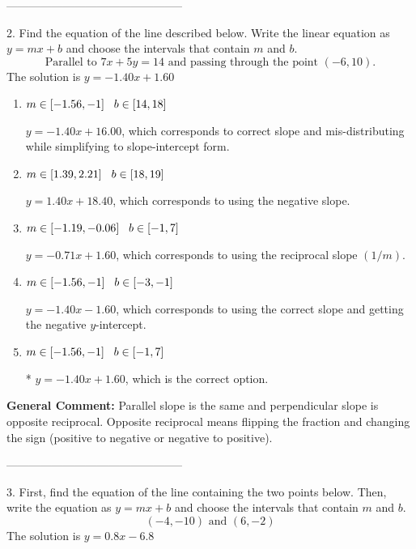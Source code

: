 \documentclass{extbook}[14pt]
\begin{document}
-----------------------------------------------

2. Find the equation of the line described below. Write the linear equation as $ y=mx+b $ and choose the intervals that contain $m$ and $b$.
\[ \text{Parallel to } 7 x + 5 y = 14 \text{ and passing through the point } (-6, 10). \] 
The solution is $ y = -1.40x + 1.60 $ 

\begin{enumerate}[label=\Alph*.] 
\item $ m \in [-1.56, -1] \hspace*{3mm} b \in [14, 18] $ 

  $y = -1.40x + 16.00$, which corresponds to correct slope and mis-distributing while simplifying to slope-intercept form. 
\item $ m \in [1.39, 2.21] \hspace*{3mm} b \in [18, 19] $ 

  $y = 1.40x + 18.40$, which corresponds to using the negative slope. 
\item $ m \in [-1.19, -0.06] \hspace*{3mm} b \in [-1, 7] $ 

  $y = -0.71x + 1.60$, which corresponds to using the reciprocal slope $(1/m)$. 
\item $ m \in [-1.56, -1] \hspace*{3mm} b \in [-3, -1] $ 

  $y = -1.40x - 1.60$, which corresponds to using the correct slope and getting the negative $y$-intercept. 
\item $ m \in [-1.56, -1] \hspace*{3mm} b \in [-1, 7] $ 

 * $y = -1.40x + 1.60$, which is the correct option. 
\end{enumerate} 
 
\textbf{General Comment:} Parallel slope is the same and perpendicular slope is opposite reciprocal. Opposite reciprocal means flipping the fraction and changing the sign (positive to negative or negative to positive). 

-----------------------------------------------

3. First, find the equation of the line containing the two points below. Then, write the equation as $ y=mx+b $ and choose the intervals that contain $m$ and $b$.
\[ (-4, -10) \text{ and } (6, -2) \] 
The solution is $ y = 0.8x -6.8 $ 
\end{document}
